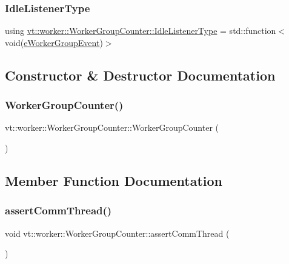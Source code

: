 \subsubsection{\texorpdfstring{Idle\+Listener\+Type}{IdleListenerType}}
{\footnotesize\ttfamily using \hyperlink{structvt_1_1worker_1_1_worker_group_counter_ae91ad4af172549bb99e1b7c32a1a0f71}{vt\+::worker\+::\+Worker\+Group\+Counter\+::\+Idle\+Listener\+Type} =  std\+::function$<$void(\hyperlink{namespacevt_1_1worker_abcb798436f1cdc4fab035def5b912d1f}{e\+Worker\+Group\+Event})$>$}



\subsection{Constructor \& Destructor Documentation}
\mbox{\label{structvt_1_1worker_1_1_worker_group_counter_a88169cef0c2a49dc51f8f77e8136080f}} 
\subsubsection{\texorpdfstring{Worker\+Group\+Counter()}{WorkerGroupCounter()}}
{\footnotesize\ttfamily vt\+::worker\+::\+Worker\+Group\+Counter\+::\+Worker\+Group\+Counter (\begin{DoxyParamCaption}{ }\end{DoxyParamCaption})\hspace{0.3cm}{\ttfamily [inline]}}



\subsection{Member Function Documentation}
\mbox{\label{structvt_1_1worker_1_1_worker_group_counter_a30b0164f0d85080bb272e8930b02df4c}} 
\subsubsection{\texorpdfstring{assert\+Comm\+Thread()}{assertCommThread()}}
{\footnotesize\ttfamily void vt\+::worker\+::\+Worker\+Group\+Counter\+::assert\+Comm\+Thread (\begin{DoxyParamCaption}{ }\end{DoxyParamCaption})\hspace{0.3cm}{\ttfamily [protected]}}

